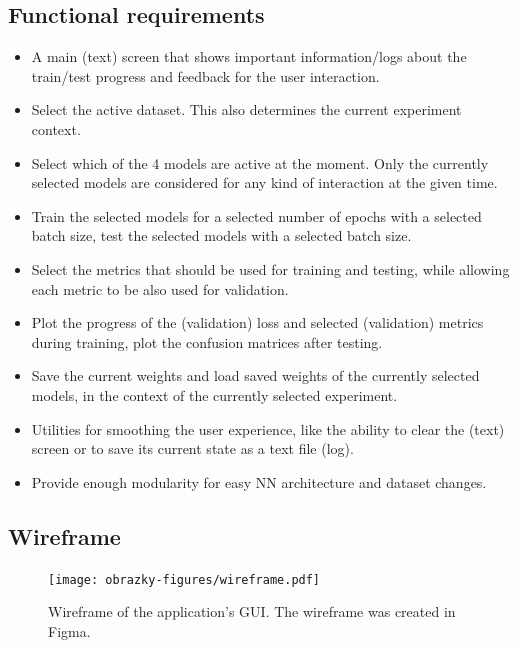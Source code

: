 \subsection*{Functional requirements}
\label{functional-requirements}
\begin{itemize}
    \item A main (text) screen that shows important information/logs about the train/test progress
    and feedback for the user interaction.
    \item Select the active dataset. This also determines the current experiment context.
    \item Select which of the 4 models are active at the moment. Only the currently selected
    models are considered for any kind of interaction at the given time.
    \item Train the selected models for a selected number of epochs with a selected batch size,
    test the selected models with a selected batch size.
    \item Select the metrics that should be used for training and testing, while allowing each metric
    to be also used for validation.
    \item Plot the progress of the (validation) loss and selected (validation) metrics during training,
    plot the confusion matrices after testing.
    \item Save the current weights and load saved weights of the currently selected models,
    in the context of the currently selected experiment.
    \item Utilities for smoothing the user experience, like the ability to clear the (text) screen
    or to save its current state as a text file (log).
    \item Provide enough modularity for easy NN architecture and dataset changes.
\end{itemize}


\subsection*{Wireframe}
\label{wireframe}
\begin{figure}[!h]
    \centering
    \texttt{[image: obrazky-figures/wireframe.pdf]}
    \caption{Wireframe of the application's GUI. The wireframe was created in
    Figma\protect\footnotemark.}
    \label{fig:wireframe}
\end{figure}




